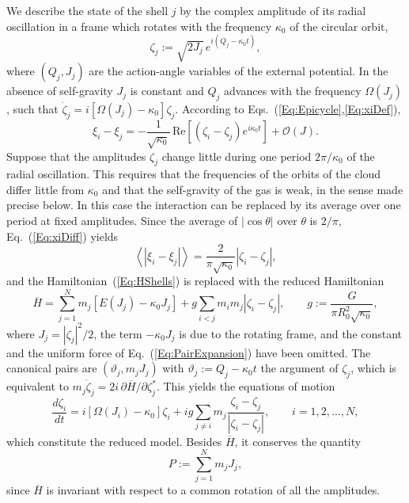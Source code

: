 \documentclass[prd,aps,nofootinbib,superscriptaddress,amsmath,amssymb]{revtex4}
\newcommand{\re}{\mbox{Re}}
\begin{document}
We describe the state of the shell $j$ by the complex amplitude of its radial oscillation in a frame which rotates with the frequency $\kappa_0$ of the circular orbit,
\begin{equation}
\zeta_j := \sqrt{2J_j}\, e^{i(Q_j - \kappa_0 t)},
\label{Eq:zetaDef}
\end{equation}
where $(Q_j,J_j)$ are the action-angle variables of the external potential. In the absence of self-gravity $J_j$ is constant and $Q_j$ advances with the frequency $\Omega(J_j)$, such that $\dot{\zeta}_j = i[\Omega(J_j) - \kappa_0]\zeta_j$. According to Eqs.~(\ref{Eq:Epicycle},\ref{Eq:xiDef}),
\begin{equation}
\xi_i - \xi_j = -\frac{1}{\sqrt{\kappa_0}}\,\re\left[ \left( \zeta_i - \zeta_j \right) e^{i\kappa_0 t} \right] + \mathcal{O}(J).
\label{Eq:xiDiff}
\end{equation}
Suppose that the amplitudes $\zeta_j$ change little during one period $2\pi/\kappa_0$ of the radial oscillation. This requires that the frequencies of the orbits of the cloud differ little from $\kappa_0$ and that the self-gravity of the gas is weak, in the sense made precise below. In this case the interaction can be replaced by its average over one period at fixed amplitudes. Since the average of $|\cos\theta|$ over $\theta$ is $2/\pi$, Eq.~(\ref{Eq:xiDiff}) yields
\begin{equation}
\left\langle \left| \xi_i - \xi_j \right| \right\rangle = \frac{2}{\pi\sqrt{\kappa_0}}\left| \zeta_i - \zeta_j \right|,
\label{Eq:AverageFixedL}
\end{equation}
and the Hamiltonian~(\ref{Eq:HShells}) is replaced with the reduced Hamiltonian
\begin{equation}
\overline{H} = \sum\limits_{j=1}^N m_j\left[ E(J_j) - \kappa_0 J_j \right] + g\sum\limits_{i<j} m_i m_j\left| \zeta_i - \zeta_j \right|,\qquad
g := \frac{G}{\pi R_0^2\sqrt{\kappa_0}},
\label{Eq:Hred}
\end{equation}
where $J_j = |\zeta_j|^2/2$, the term $-\kappa_0 J_j$ is due to the rotating frame, and the constant and the uniform force of Eq.~(\ref{Eq:PairExpansion}) have been omitted. The canonical pairs are $(\vartheta_j,m_j J_j)$ with $\vartheta_j := Q_j - \kappa_0 t$ the argument of $\zeta_j$, which is equivalent to $m_j\dot{\zeta}_j = 2i\,\partial\overline{H}/\partial\zeta_j^*$. This yields the equations of motion
\begin{equation}
\frac{d\zeta_i}{dt} = i\left[ \Omega(J_i) - \kappa_0 \right]\zeta_i
 + i g\sum\limits_{j\neq i} m_j\frac{\zeta_i - \zeta_j}{|\zeta_i - \zeta_j|},\qquad i = 1,2,\ldots,N,
\label{Eq:Reduced}
\end{equation}
which constitute the reduced model. Besides $\overline{H}$, it conserves the quantity
\begin{equation}
P := \sum\limits_{j=1}^N m_j J_j,
\label{Eq:PDef}
\end{equation}
since $\overline{H}$ is invariant with respect to a common rotation of all the amplitudes.
\end{document}
